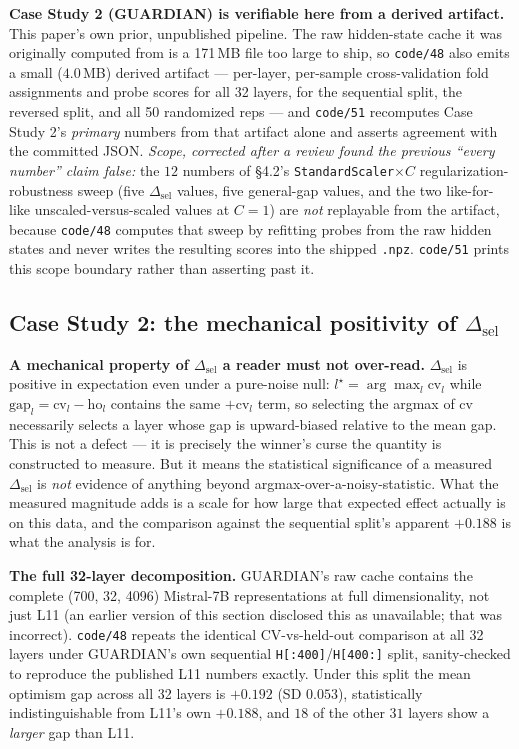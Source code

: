 \documentclass[10pt]{article} %
\begin{document}
\textbf{Case Study 2 (GUARDIAN) is verifiable here from a derived artifact.} This paper's own prior, unpublished pipeline. The raw
hidden-state cache it was originally computed from is a 171\,MB file
too large to ship, so \texttt{code/48} also emits a small ($4.0$\,MB)
derived artifact --- per-layer, per-sample cross-validation fold
assignments and probe scores for all 32 layers, for the sequential split,
the reversed split, and all 50 randomized reps --- and \texttt{code/51}
recomputes Case Study 2's \emph{primary} numbers from that artifact alone
and asserts agreement with the committed JSON. \emph{Scope, corrected
after a review found the previous ``every number'' claim false:} the $12$
numbers of §4.2's \texttt{StandardScaler}$\times C$
regularization-robustness sweep (five $\Delta_{\text{sel}}$ values, five
general-gap values, and the two like-for-like unscaled-versus-scaled
values at $C=1$) are \emph{not} replayable from the artifact, because
\texttt{code/48} computes that sweep by refitting probes from the raw
hidden states and never writes the resulting scores into the shipped
\texttt{.npz}. \texttt{code/51} prints this scope boundary rather than
asserting past it.

\subsection{Case Study 2: the mechanical positivity of $\Delta_{\text{sel}}$}

\textbf{A mechanical property of $\Delta_{\text{sel}}$ a reader must not
over-read.} $\Delta_{\text{sel}}$ is positive in expectation even under a
pure-noise null: $l^\star=\arg\max_l \text{cv}_l$ while
$\text{gap}_l=\text{cv}_l-\text{ho}_l$ contains the same $+\text{cv}_l$ term,
so selecting the argmax of $\text{cv}$ necessarily selects a layer whose gap
is upward-biased relative to the mean gap. This is not a defect --- it is
precisely the winner's curse the quantity is constructed to measure. But it
means the statistical significance of a measured $\Delta_{\text{sel}}$ is
\emph{not} evidence of anything beyond argmax-over-a-noisy-statistic. What
the measured magnitude adds is a scale for how large that expected effect
actually is on this data, and the comparison against the sequential split's
apparent $+0.188$ is what the analysis is for.


\medskip\noindent\textbf{The full 32-layer decomposition.} GUARDIAN's raw cache contains the
complete (700, 32, 4096) Mistral-7B representations at full dimensionality, not
just L11 (an earlier version of this section disclosed this as unavailable;
that was incorrect). \texttt{code/48} repeats the identical CV-vs-held-out
comparison at all 32 layers under GUARDIAN's own sequential
\texttt{H[:400]}/\texttt{H[400:]} split, sanity-checked to reproduce the
published L11 numbers exactly. Under this split the mean optimism gap across
all 32 layers is $+0.192$ (SD $0.053$), statistically indistinguishable from
L11's own $+0.188$, and $18$ of the other $31$ layers show a \emph{larger} gap
than L11.
\end{document}

